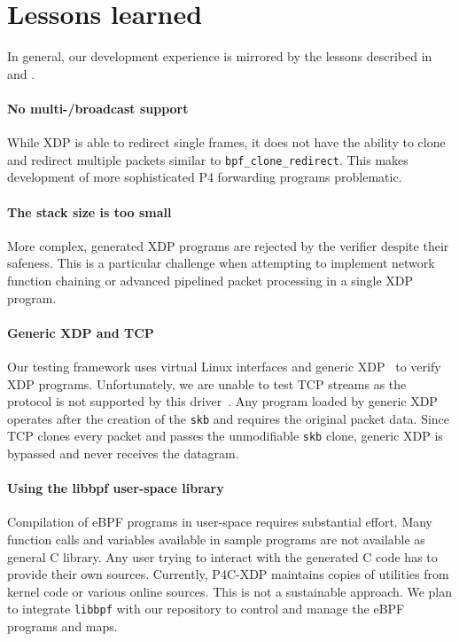 \section{Lessons learned}\label{sec:conclusions}

In general, our development experience is mirrored by the lessons described
in \cite{minao-hspr18} and \cite{bertin-netdev17}.

\paragraph{No multi-/broadcast support}
While XDP is able to redirect single frames, it does not have the ability to 
clone and redirect multiple packets similar to \texttt{bpf\_clone\_redirect}. 
This makes development of more sophisticated P4 forwarding programs problematic.

\paragraph{The stack size is too small}
More complex, generated XDP programs are rejected by the verifier despite their 
safeness. 
This is a particular challenge when attempting to implement network function 
chaining or advanced pipelined packet processing in a single XDP program. 

\paragraph{Generic XDP and TCP}
Our testing framework uses virtual Linux interfaces and generic 
XDP~\cite{genericxdp} to verify XDP programs. 
Unfortunately, we are unable to test TCP streams as the protocol is not 
supported by this driver~\cite{xdptcp}.
Any program loaded by generic XDP operates after the creation of
the \texttt{skb} and requires the original packet data. Since TCP clones every 
packet and passes the unmodifiable \texttt{skb} clone, generic XDP is
bypassed and never receives the datagram.

\paragraph{Using the libbpf user-space library}
Compilation of eBPF programs in user-space requires substantial 
effort. Many function calls and variables available in sample programs are not 
available as general C library. Any user trying to interact with the 
generated C code has to provide their own sources. Currently, P4C-XDP maintains 
copies of utilities from kernel code or various online sources. This is not a 
sustainable approach. We plan to integrate \texttt{libbpf} with our repository 
to control and manage the eBPF programs and maps.

